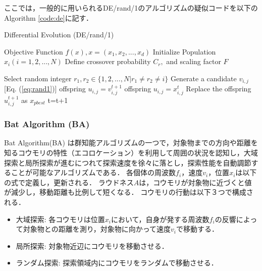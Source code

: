 \documentclass[a4j,11pt]{jarticle}
\begin{document}
ここでは，一般的に用いられるDE/rand/1のアルゴリズムの疑似コードを以下のAlgorithm \ref{code:de}に記す．

\begin{algorithm}[H]
\caption{Differential Evolution (DE/rand/1)}
\label{code:de}
\begin{algorithmic}[3]
\REQUIRE Objective Function $f(x), x=(x_1,x_2,...,x_d)$
\STATE Initialize Population $x_i (i=1,2,...,N)$ 
\STATE Define crossover probability $C_r,$ and scaling factor $F$

\STATE Select random integer $r_1, r_2 \in \{ 1,2,..., N| r_1 \neq r_2 \neq i\}$
\STATE Generate a candidate $v_{i,j}$  [Eq. (\ref{eq:rand1})]
\STATE offspring $u_{i,j} = v_{i,j}^{t+1}$
\STATE offspring $u_{i,j} = x_{i,j}^t$
\ENDIF
\ENDFOR
{}
\STATE Replace the offspring $u_{i,j}^{t+1}$ as $x_{pbest}$
\ENDIF
\ENDFOR
\STATE t=t+1
\ENDWHILE
\end{algorithmic}
\end{algorithm}


\subsubsection{Bat Algorithm (BA)}
\label{sss:BA}


Bat Algorithm(BA) \cite{BA}は群知能アルゴリズムの一つで，対象物までの方向や距離を知るコウモリの特性（エコロケーション）を利用して周囲の状況を認知し，大域探索と局所探索が進むにつれて探索速度を徐々に落とし，探索性能を自動調節することが可能なアルゴリズムである．
各個体の周波数${f_i}$，速度${v_i}$，位置${x_i}$は以下の式で定義し，更新される．
ラウドネス${A}$は，コウモリが対象物に近づくと値が減少し，移動距離も比例して短くなる．
コウモリの行動は以下３つで構成される．
\begin{itemize}
\item 大域探索: 各コウモリは位置${x_i}$において，自身が発する周波数${f_i}$の反響によって対象物との距離を測り，対象物に向かって速度${v_i}$で移動する．
\item 局所探索: 対象物近辺にコウモリを移動させる．
\item ランダム探索: 探索領域内にコウモリをランダムで移動させる．
\end{itemize}
\end{document}
